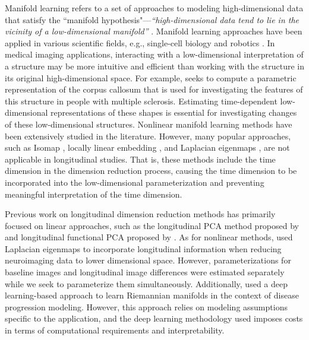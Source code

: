 \documentclass[12pt]{article}
\theoremstyle{definition}
\begin{document}
Manifold learning refers to a set of approaches to modeling high-dimensional data that satisfy the ``manifold hypothesis"---\textit{``high-dimensional data tend to lie in the vicinity of a low-dimensional manifold''} \citep{fefferman2016testing}. Manifold learning approaches have been applied in various scientific fields, e.g., single-cell biology \citep{ding2023learning} and robotics \citep{gao2023k}. In medical imaging applications, interacting with a low-dimensional interpretation of a structure may be more intuitive and efficient than working with the structure in its original high-dimensional space. For example, \cite{yueParameterizationWhiteMatter2016} seeks to compute a parametric representation of the corpus callosum that is used for investigating the features of this structure in people with multiple sclerosis. Estimating time-dependent low-dimensional representations of these shapes is essential for investigating changes of these low-dimensional structures. Nonlinear manifold learning methods have been extensively studied in the literature. However, many popular approaches, such as Isomap \citep{tenenbaumGlobalGeometricFramework2000}, locally linear embedding \citep{roweisNonlinearDimensionalityReduction2000}, and Laplacian eigenmaps \citep{belkin2003laplacian}, are not applicable in longitudinal studies. That is, these methods include the time dimension in the dimension reduction process, causing the time dimension to be incorporated into the low-dimensional parameterization and preventing meaningful interpretation of the time dimension. %

Previous work on longitudinal dimension reduction methods has primarily focused on linear approaches, such as the longitudinal PCA method proposed by \cite{kinsonLongitudinalPrincipalComponent2020} and longitudinal functional PCA proposed by \cite{greven2011longitudinal}. As for nonlinear methods, \cite{wolzManifoldLearningBiomarker2010} used Laplacian eigenmaps to incorporate longitudinal information when reducing neuroimaging data to lower dimensional space. However, parameterizations for baseline images and longitudinal image differences were estimated separately while we seek to parameterize them simultaneously. Additionally, \cite{louisRiemannianGeometryLearning2019} used a deep learning-based approach to learn Riemannian manifolds in the context of disease progression modeling. However, this approach relies on modeling assumptions specific to the application, and the deep learning methodology used imposes costs in terms of computational requirements and interpretability. 
\end{document}
